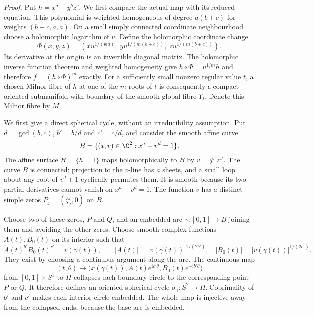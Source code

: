 \begin{proof}
Put $h=x^a-y^bz^c$. We first compare the actual map
with its reduced equation. This polynomial is weighted
homogeneous of degree $a(b+c)$ for weights
$(b+c,a,a)$. On a small simply connected coordinate
neighbourhood choose a holomorphic logarithm of $u$.
Define the holomorphic coordinate change
\[
 \Phi(x,y,z)=\left(
 x u^{1/(ma)},\;
 y u^{1/(m(b+c))},\;
 z u^{1/(m(b+c))}\right).
                                                        \tag{A.J.34}
\]
Its derivative at the origin is an invertible diagonal
matrix. The holomorphic inverse function theorem and
weighted homogeneity give
$h\circ\Phi=u^{1/m}h$ and therefore
$f=(h\circ\Phi)^m$ exactly. For a sufficiently small
nonzero regular value $t$, a chosen Milnor fibre of
$h$ at one of the $m$ roots of $t$ is consequently a
compact oriented submanifold with boundary of the
smooth global fibre $Y_t$. Denote this Milnor fibre
by $M$.

We first give a direct spherical cycle, without an
irreducibility assumption. Put $d=\gcd(b,c)$,
$b'=b/d$ and $c'=c/d$, and consider the smooth affine
curve
\[
 B=\{(x,v)\in\C^2:x^a-v^d=1\}.
\]
The affine surface $H=\{h=1\}$ maps holomorphically
to $B$ by $v=y^{b'}z^{c'}$. The curve $B$ is
connected: projection to the $v$-line has $a$ sheets,
and a small loop about any root of $v^d+1$ cyclically
permutes them. It is smooth because its two partial
derivatives cannot vanish on $x^a-v^d=1$.
The function $v$ has $a$ distinct simple zeros
$P_j=(\zeta_a^j,0)$ on $B$.

Choose two of these zeros, $P$ and $Q$, and an
embedded arc $\gamma:[0,1]\to B$ joining them and
avoiding the other zeros. Choose smooth complex
functions $A(t),B_0(t)$ on its interior such that
\[
 A(t)^{b'}B_0(t)^{c'}=v(\gamma(t)),\qquad
 |A(t)|=|v(\gamma(t))|^{1/(2b')},\quad
 |B_0(t)|=|v(\gamma(t))|^{1/(2c')}.
\]
They exist by choosing a continuous argument along
the arc. The continuous map
\[
 (t,\theta)\longmapsto
 \bigl(x(\gamma(t)),A(t)e^{\mathrm i c'\theta},
                 B_0(t)e^{-\mathrm i b'\theta}\bigr)
                                                        \tag{A.J.33a}
\]
from $[0,1]\times S^1$ to $H$ collapses each boundary
circle to the corresponding point $P$ or $Q$.
It therefore defines an oriented spherical cycle
$\sigma_\gamma:S^2\to H$. Coprimality of $b'$ and
$c'$ makes each interior circle embedded. The whole
map is injective away from the collapsed ends,
because the base arc is embedded.


\end{proof}
